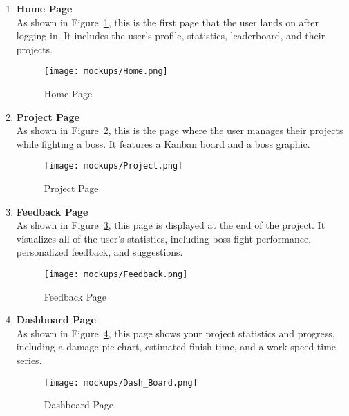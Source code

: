 \label{section:user-interface-design}

\begin{enumerate}

    \item \textbf{Home Page} \\
    As shown in Figure~\ref{fig:home}, this is the first page that the user lands on after logging in. It includes the user's profile, statistics, leaderboard, and their projects.    
    \begin{figure}[H]
        \centering
        \texttt{[image: mockups/Home.png]}
        \caption{Home Page}
        \label{fig:home}
    \end{figure}
    
    \item \textbf{Project Page} \\
    As shown in Figure~\ref{fig:project}, this is the page where the user manages their projects while fighting a boss. It features a Kanban board and a boss graphic.    
    \begin{figure}[H]
        \centering
        \texttt{[image: mockups/Project.png]}
        \caption{Project Page}
        \label{fig:project}
    \end{figure}
    \newpage

    \item \textbf{Feedback Page} \\
    As shown in Figure~\ref{fig:feedback}, this page is displayed at the end of the project. It visualizes all of the user's statistics, including boss fight performance, personalized feedback, and suggestions.    
    \begin{figure}[H]
        \centering
        \texttt{[image: mockups/Feedback.png]}
        \caption{Feedback Page}
        \label{fig:feedback}
    \end{figure}

    \item \textbf{Dashboard Page} \\
    As shown in Figure~\ref{fig:dashboard}, this page shows your project statistics and progress, including a damage pie chart, estimated finish time, and a work speed time series.    
    \begin{figure}[H]
        \centering
        \texttt{[image: mockups/Dash\_Board.png]}
        \caption{Dashboard Page}
        \label{fig:dashboard}
    \end{figure}

\end{enumerate}

